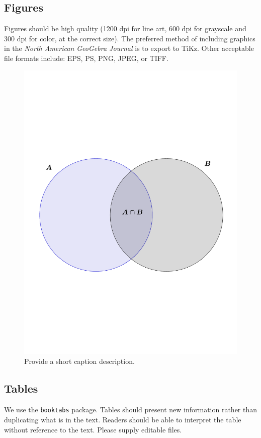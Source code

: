  \subsection{Figures}
Figures should be high quality (1200 dpi for line art, 600 dpi for grayscale and 300 dpi for color, at the correct size). The preferred method of including graphics in the \textit{North American GeoGebra Journal} is to export to TiKz. Other acceptable file formats include: EPS, PS, PNG, JPEG, or TIFF.  
  
 \begin{figure}[h!] %
    \centering
    \includegraphics[scale=0.5]{figs/venn.pdf} 
    \caption{Provide a short caption description.}
    \label{fig:number}
 \end{figure}
 
 
\subsection{Tables}
We use the \texttt{booktabs} package.  Tables should present new information rather than duplicating what is in the text. Readers should be able to interpret the table without reference to the text. Please supply editable files.


